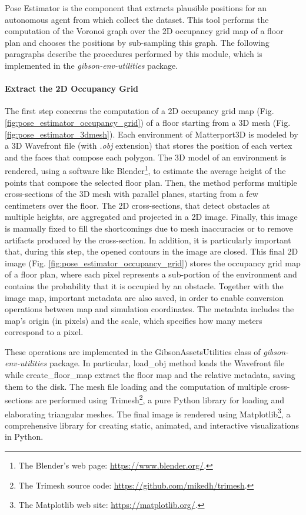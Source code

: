 Pose Estimator is the component that extracts plausible positions for an autonomous agent from which collect the dataset. This tool performs the computation of the Voronoi graph over the 2D occupancy grid map \cite{cuupancygridfirst} of a floor plan and chooses the positions by sub-sampling this graph. The following paragraphs describe the procedures performed by this module, which is implemented in the \textit{gibson-env-utilities} package.



\paragraph*{Extract the 2D Occupancy Grid} The first step concerns the computation of a 2D occupancy grid map (Fig. \ref{fig:pose_estimator_occupancy_grid}) of a floor starting from a 3D mesh (Fig. \ref{fig:pose_estimator_3dmesh}). Each environment of Matterport3D is modeled by a 3D Wavefront file (with \textit{.obj} extension) that stores the position of each vertex and the faces that compose each polygon. The 3D model of an environment is rendered, using a software like Blender\footnote{The Blender's web page: \url{https://www.blender.org/}.}, to estimate the average height of the points that compose the selected floor plan. Then, the method performs multiple cross-sections of the 3D mesh with parallel planes, starting from a few centimeters over the floor. The 2D cross-sections, that detect obstacles at multiple heights, are aggregated and projected in a 2D image. Finally, this image is manually fixed to fill the shortcomings due to mesh inaccuracies or to remove artifacts produced by the cross-section. In addition, it is particularly important that, during this step, the opened contours in the image are closed. This final 2D image (Fig. \ref{fig:pose_estimator_occupancy_grid}) stores the occupancy grid map of a floor plan, where each pixel represents a sub-portion of the environment and contains the probability that it is occupied by an obstacle. Together with the image map, important metadata are also saved, in order to enable conversion operations between map and simulation coordinates. The metadata includes the map's origin (in pixels) and the scale, which specifies how many meters correspond to a pixel.

These operations are implemented in the \textsf{GibsonAssetsUtilities} class of \textit{gibson-env-utilities} package. In particular, \textsf{load\_obj} method loads the Wavefront file while \textsf{create\_floor\_map} extract the floor map and the relative metadata, saving them to the disk. The mesh file loading and the computation of multiple cross-sections are performed using Trimesh\footnote{The Trimesh source code: \url{https://github.com/mikedh/trimesh}.}, a pure Python library for loading and elaborating triangular meshes. The final image is rendered using Matplotlib\footnote{The Matplotlib web site: \url{https://matplotlib.org/}.}, a comprehensive library for creating static, animated, and interactive visualizations in Python. 

